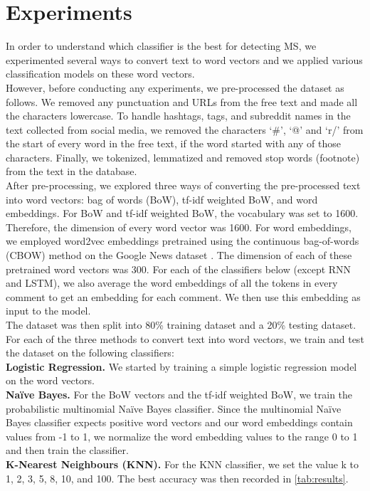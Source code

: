 \documentclass[11pt,a4paper]{article}
\begin{document}
\section{Experiments}
In order to understand which classifier is the best for detecting MS, we experimented several ways to convert text to word vectors and we applied various classification models on these word vectors. \\
\indent However, before conducting any experiments, we pre-processed the dataset as follows. We removed any punctuation and URLs from the free text and made all the characters lowercase. To handle hashtags, tags, and subreddit names in the text collected from social media, we removed the characters ‘\#’, ‘@’ and ‘r/’ from the start of every word in the free text, if the word started with any of those characters. Finally, we tokenized, lemmatized and removed stop words (footnote) from the text in the database. \\
\indent After pre-processing, we explored three ways of converting the pre-processed text into word vectors: bag of words (BoW), tf-idf weighted BoW, and word embeddings. For BoW and tf-idf weighted BoW, the vocabulary was set to 1600. Therefore, the dimension of every word vector was 1600. For word embeddings, we employed word2vec embeddings pretrained using the continuous bag-of-words (CBOW) method on the Google News dataset \citep{Mikolav:13}. The dimension of each of these pretrained word vectors was 300. For each of the classifiers below (except RNN and LSTM), we also average the word embeddings of all the tokens in every comment to get an embedding for each comment. We then use this embedding as input to the model. \\
\indent The dataset was then split into 80\% training dataset and a 20\% testing dataset. For each of the three methods to convert text into word vectors, we train and test the dataset on the following classifiers: \\
\indent \textbf{Logistic Regression.} We started by training a simple logistic regression model on the word vectors. \\
\indent \textbf{Naïve Bayes.} For the BoW vectors and the tf-idf weighted BoW, we train the probabilistic multinomial Naïve Bayes classifier. Since the multinomial Naïve Bayes classifier expects positive word vectors and our word embeddings contain values from -1 to 1, we normalize the word embedding values to the range 0 to 1 and then train the classifier. \\
\indent \textbf{K-Nearest Neighbours (KNN).} For the KNN classifier, we set the value k to 1, 2, 3, 5, 8, 10, and 100. The best accuracy was then recorded in \autoref{tab:results}. \\
\end{document}
